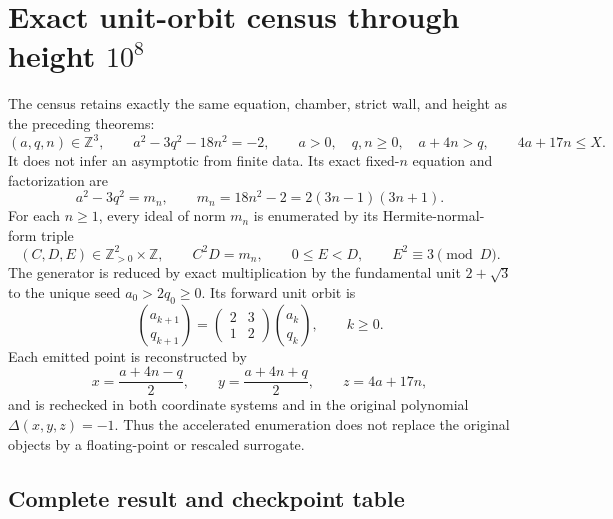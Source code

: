 
\section{Exact unit-orbit census through height \(10^8\)}
\label{koide-count-sec-census-1e8}

The census retains exactly the same equation, chamber, strict wall, and
height as the preceding theorems:
\begin{equation}
 (a,q,n)\in\mathbb Z^3,\qquad
 a^2-3q^2-18n^2=-2,\qquad
 a>0,\quad q,n\geq0,\quad a+4n>q,\qquad
 4a+17n\leq X.
 \label{koide-count-eq-census-domain}
\end{equation}
It does not infer an asymptotic from finite data.  Its exact fixed-\(n\)
equation and factorization are
\begin{equation}
 a^2-3q^2=m_n,\qquad
 m_n=18n^2-2=2(3n-1)(3n+1).
 \label{koide-count-eq-census-fixed-n}
\end{equation}
For each \(n\geq1\), every ideal of norm \(m_n\) is enumerated by its
Hermite-normal-form triple
\begin{equation}
 (C,D,E)\in\mathbb Z_{>0}^2\times\mathbb Z,\qquad
 C^2D=m_n,\qquad
 0\leq E<D,\qquad E^2\equiv3\pmod D.
 \label{koide-count-eq-census-hnf}
\end{equation}
The generator is reduced by exact multiplication by the fundamental unit
\(2+\sqrt3\) to the unique seed \(a_0>2q_0\geq0\).  Its forward unit
orbit is
\begin{equation}
 \binom{a_{k+1}}{q_{k+1}}
 =
 \begin{pmatrix}2&3\\1&2\end{pmatrix}
 \binom{a_k}{q_k},\qquad k\geq0.
 \label{koide-count-eq-census-unit-step}
\end{equation}
Each emitted point is reconstructed by
\begin{equation}
 x=\frac{a+4n-q}{2},\qquad
 y=\frac{a+4n+q}{2},\qquad
 z=4a+17n,
 \label{koide-count-eq-census-inverse}
\end{equation}
and is rechecked in both coordinate systems and in the original polynomial
\(\Delta(x,y,z)=-1\).  Thus the accelerated enumeration does not replace
the original objects by a floating-point or rescaled surrogate.

\subsection{Complete result and checkpoint table}

